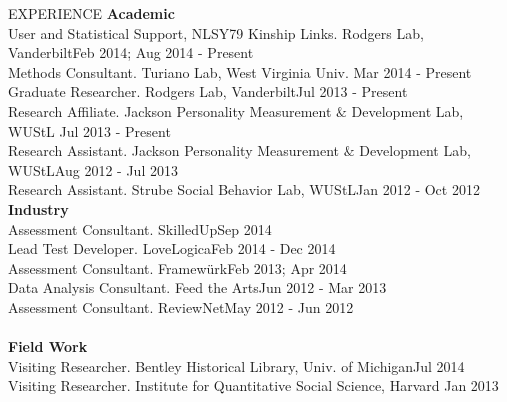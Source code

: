 \documentclass {resume}
\begin{document}
\begin{rSection}{\textrm{EXPERIENCE}}
{\large \textbf{Academic}}\\
User and Statistical Support, NLSY79 Kinship Links. Rodgers Lab, Vanderbilt\hfill Feb 2014; Aug 2014 - Present\smallskip\\
Methods Consultant. Turiano Lab, West Virginia Univ. \hfill Mar 2014 - Present\smallskip\\%
Graduate Researcher. Rodgers Lab, Vanderbilt\hfill Jul 2013 - Present\smallskip\\
Research Affiliate. Jackson Personality Measurement $\&$ Development Lab, WUStL \hfill Jul 2013 - Present\smallskip\\
Research Assistant. Jackson Personality Measurement $\&$ Development Lab, WUStL\hfill Aug 2012 - Jul 2013\smallskip\\
Research Assistant. Strube Social Behavior Lab, WUStL\hfill Jan 2012 - Oct 2012\medskip\\
{\large \textbf{Industry}}\\
Assessment Consultant. SkilledUp\hfill Sep 2014\smallskip\\
Lead Test Developer. LoveLogica\hfill Feb 2014 - Dec 2014\smallskip\\
Assessment Consultant. Framew\"{u}rk\hfill Feb 2013; Apr 2014\smallskip\\
Data Analysis Consultant. Feed the Arts\hfill Jun 2012 - Mar 2013\smallskip\\
Assessment Consultant. ReviewNet\hfill May 2012 - Jun 2012\medskip\\\pagebreak\\
{\large \textbf{Field Work}}\\
Visiting Researcher. Bentley Historical Library, Univ. of Michigan\hfill Jul 2014\smallskip\\
Visiting Researcher. Institute for Quantitative Social Science, Harvard \hfill Jan 2013%
\end{rSection}%
\end{document}
